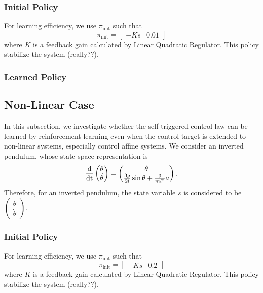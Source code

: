 \documentclass[english, dvipdfmx]{ampmt}             %
\newcommand{\odif}[2]{\frac{\rm{d}#1}{\rm{d}#2}}
\begin{document}
\subsubsection{Initial Policy}
For learning efficiency, we use $\pi_{\textrm{init}}$ such that
\begin{equation}
	\pi_{\textrm{init}} = \begin{bmatrix}-Ks&0.01\end{bmatrix}
\end{equation}
where $K$ is a feedback gain calculated by Linear Quadratic Regulator. This policy stabilize the system (really??).

\subsubsection{Learned Policy}





\subsection{Non-Linear Case}
In this subsection, we investigate whether the self-triggered control law can be learned by reinforcement learning even when the control target is extended to non-linear systems, especially control affine systems. We consider an inverted pendulum, whose state-space representation is
\begin{equation}
	\odif{}{t}\begin{pmatrix}\theta \\ \dot{\theta}\end{pmatrix} = 
		\begin{pmatrix}\dot{\theta} \\ \frac{3g}{2l}\sin{\theta} + \frac{3}{ml^2}a \end{pmatrix} \label{pendulum}.
\end{equation}
Therefore, for an inverted pendulum, the state variable $s$ is considered to be $\begin{pmatrix}\theta \\ \dot{\theta}\end{pmatrix}$.
\par
\subsubsection{Initial Policy}
For learning efficiency, we use $\pi_{\textrm{init}}$ such that
\begin{equation}
	\pi_{\textrm{init}} = \begin{bmatrix}-Ks&0.2\end{bmatrix}
\end{equation}
where $K$ is a feedback gain calculated by Linear Quadratic Regulator. This policy stabilize the system (really??).
\end{document}
